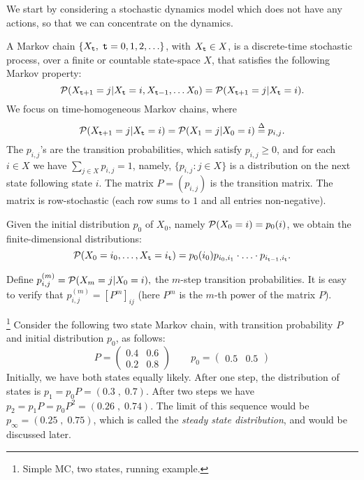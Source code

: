 


We start by considering a stochastic dynamics model which does not
have any actions, so that we can concentrate on the dynamics.

A Markov chain $\{ {X_{\tt t}},\;{\tt t} = 0,1,2, \ldots \} $, with
${X_{\tt t}} \in X$, is a discrete-time stochastic process, over a
finite or countable state-space $X$, that satisfies the following
Markov property:
    \[{\cal P}({X_{{\tt t} +1}} = j|{X_{\tt t}} = i,{X_{{\tt t} - 1}}, \ldots {X_0}) = {\cal P}({X_{{\tt t} +1}} = j|{X_{\tt t}} = i).\]
We focus on time-homogeneous Markov chains, where
\[{\cal P}({X_{\ttime +1}} = j|{X_\ttime} = i) = {\cal P}({X_1} = j|{X_0} = i) \buildrel \Delta \over = {p_{i,j}}.\]
The ${p_{i,j}}$'s  are the transition probabilities, which satisfy
$p_{i,j} \ge 0$, and for each $ i\in X$ we have $\sum_{j \in X}
{{p_{i,j}} = 1} $, namely, $\{p_{i,j}:j\in X\}$ is a distribution on
the next state following state $i$.  The matrix $P = ({p_{i,j}})$ is
the transition matrix. The matrix is row-stochastic (each row sums
to $1$ and all entries non-negative).

Given the initial distribution ${p_0}$ of ${X_0}$, namely ${\cal
P}({X_0} = i) = {p_0}(i)$, we obtain the finite-dimensional
distributions:
\[{\cal P}({X_0} = {i_0}, \ldots ,{X_{\tt t}} = {i_{\tt t}}) = {p_0}(i_0){p_{{i_0},{i_1}}} \cdot  \ldots  \cdot {p_{{i_{{\tt t}- 1}},{i_{\tt t}}}}.\]

Define $p_{i,j}^{(m)} = {\cal P}({X_m} = j|{X_0} = i),$ the $m$-step
transition probabilities.  It is easy to verify that $p_{i,j}^{(m)}
= {[{P^m}]_{ij}}$  (here ${P^m}$ is the $m$-th power of the matrix
$P$).

\begin{example}
\footnote{Simple MC, two states, running example.} Consider the
following two state Markov chain, with transition probability $P$
and initial distribution $p_0$, as follows:
$$
P=
\begin{pmatrix}
0.4 & 0.6  \\
0.2 & 0.8
\end{pmatrix}
\qquad p_0=
\begin{pmatrix}
0.5  & 0.5
\end{pmatrix}
$$
Initially, we have both states equally likely. After one step, the
distribution of states is $p_1=p_0 P=(0.3\;,\; 0.7)$. After two
steps we have $p_2=p_1 P=p_0 P^2 = (0.26 \;,\; 0.74 )$. The limit of
this sequence would be $p_\infty =(0.25 \;,\; 0.75)$, which is
called the {\em steady state distribution}, and would be discussed
later.
\end{example}

